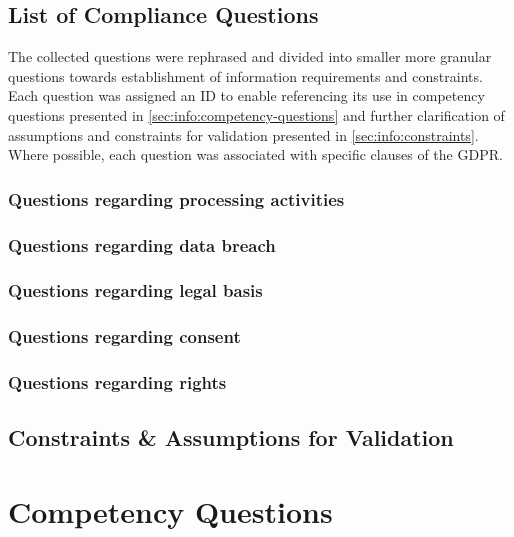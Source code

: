 \subsection{List of Compliance Questions}
The collected questions were rephrased and divided into smaller more granular questions towards establishment of information requirements and constraints. 
Each question was assigned an ID to enable referencing its use in competency questions presented in \autoref{sec:info:competency-questions} and further clarification of assumptions and constraints for validation presented in \autoref{sec:info:constraints}.
Where possible, each question was associated with specific clauses of the GDPR. 

\subsubsection{Questions regarding processing activities}

\subsubsection{Questions regarding data breach}

\subsubsection{Questions regarding legal basis}

\subsubsection{Questions regarding consent}

\subsubsection{Questions regarding rights}

\subsection{Constraints \& Assumptions for Validation}\label{sec:info:constraints}

\section{Competency Questions}\label{sec:info:competency-questions}

